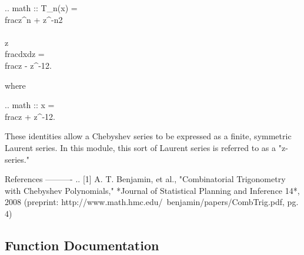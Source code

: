 \begin{DoxyVerb}
.. math ::
    T_n(x) = \\frac{z^n + z^{-n}}{2} \\\\
    z\\frac{dx}{dz} = \\frac{z - z^{-1}}{2}.

where

.. math :: x = \\frac{z + z^{-1}}{2}.

These identities allow a Chebyshev series to be expressed as a finite,
symmetric Laurent series.  In this module, this sort of Laurent series
is referred to as a "z-series."

References
----------
.. [1] A. T. Benjamin, et al., "Combinatorial Trigonometry with Chebyshev
  Polynomials," *Journal of Statistical Planning and Inference 14*, 2008
  (preprint: http://www.math.hmc.edu/~benjamin/papers/CombTrig.pdf, pg. 4)\end{DoxyVerb}
 

\subsection{Function Documentation}
\hypertarget{namespacepyneb_1_1utils_1_1chebyshev_a640344fc14aa36e14d0e93eba4411188}{}
